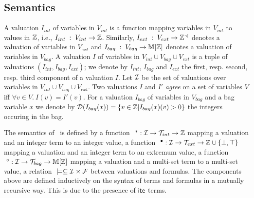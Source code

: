 \subsection{Semantics}
\label{ssec:sem}


A valuation $I_{int}$ of variables in $V_{int}$ is a function mapping variables in $V_{int}$ to values in $\mathbb{Z}$, i.e.,
$I_{int} \; : \; V_{int} \rightarrow \mathbb{Z}$.
Similarly, $I_{ext} \; : \; V_{ext} \rightarrow \mathbb{Z}^{\prec}$ denotes a valuation of variables in $V_{ext}$ 
and
$I_{bag} \; : \; V_{bag} \rightarrow \mathbb{M}[\mathbb{Z}]$ denotes a valuation of variables in $V_{bag}$.
A valuation $I$ of variables in $V_{int}\cup V_{bag} \cup V_{ext}$ is a tuple of valuations $(I_{int}, I_{bag}, I_{ext})$;
we denote by $I_{int}$, $I_{bag}$ and $I_{ext}$ the first, resp. second, resp. third component of a valuation $I$.
Let $\mathcal{I}$ be the set of valuations over variables in $V_{int}\cup V_{bag}\cup V_{ext}$.
Two valuations $I$ and $I'$ \emph{agree} on a set of variables $V$ iff $\forall v\in V.\ I(v) = I'(v)$.
For a valuation $I_{bag}$ of variables in $V_{bag}$ and a bag variable $x$ we denote by
$\mathcal{D}(I_{bag}(x)) = \left\{ v \in \mathbb{Z} | I_{bag}(x)(v) > 0 \right\}$ the integers occuring in the bag.

The semantics of \QFBILIA\ is defined by
a function $\ ^*: \mathcal{I}\rightarrow \mathcal{T}_{int}\rightarrow \mathbb{Z}$ mapping a valuation and an integer term to an integer value,
a function $\ ^{\bullet}: \mathcal{I}\rightarrow \mathcal{T}_{ext}\rightarrow \mathbb{Z}\cup\{\bot,\top\}$ mapping a valuation and an integer term to an extremum value,
a function $\ ^\circ: \mathcal{I}\rightarrow \mathcal{T}_{bag}\rightarrow \mathbb{M}[\mathbb{Z}]$ mapping a valuation and a multi-set term to a multi-set value,
a relation $\ \models \subseteq \mathcal{I}\times \mathcal{F}$ between valuations and formulas.
The components above are defined inductively on the syntax of terms and formulas in a mutually recursive way.
This is due to the presence of $\textsf{ite}$ terms.

